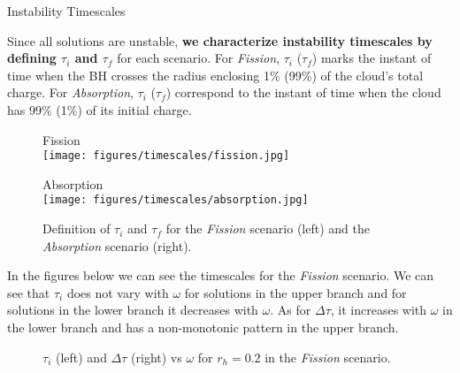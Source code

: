 \begin{block}{Instability Timescales}

Since all solutions are unstable, \textbf{we characterize instability timescales by defining $\tau_i$ and $\tau_f$} for each scenario. For \textit{Fission}, $\tau_i$ ($\tau_f$) marks the instant of time when the \gls{BH} crosses the radius enclosing 1\% (99\%) of the cloud's total charge. For \textit{Absorption}, $\tau_i$ ($\tau_f$) correspond to the instant of time when the cloud has 99\% (1\%) of its initial charge.

\begin{figure}[h!]
    \centering
    \begin{minipage}[b]{0.49\textwidth}
        \centering
        {\large \Raleway \textmd{Fission}} \\
        \vspace{0.75em}
        \texttt{[image: figures/timescales/fission.jpg]}
    \end{minipage}
    \hfill
    \begin{minipage}[b]{0.49\textwidth}
        \centering
        {\large \Raleway \textmd{Absorption}} \\
        \vspace{0.75em}
        \texttt{[image: figures/timescales/absorption.jpg]}
    \end{minipage}
    \caption{Definition of $\tau_i$ and $\tau_f$ for the \textit{Fission} scenario (left) and the \textit{Absorption} scenario (right).}
\end{figure}

In the figures below we can see the timescales for the \textit{Fission} scenario. We can see that $\tau_i$ does not vary with $\omega$ for solutions in the upper branch and for solutions in the lower branch it decreases with $\omega$. As for $\Delta \tau$, it increases with $\omega$ in the lower branch and has a non-monotonic pattern in the upper branch.

\begin{figure}[h!]
    \centering
    \begin{minipage}[b]{0.49\textwidth}
        \centering
        
    \end{minipage}
    \hfill
    \begin{minipage}[b]{0.49\textwidth}
        \centering
        
    \end{minipage}
    \caption{$\tau_i$ (left) and $\Delta \tau$ (right) vs $\omega$ for $r_h = 0.2$ in the \textit{Fission} scenario.}
\end{figure}


\end{block}
